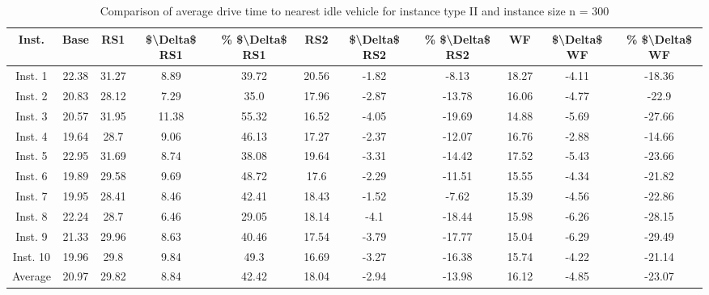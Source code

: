 \begin{table}[H]
\centering
\begin{tabular}{ccccccccccc}
  \hline
  \textbf{Inst.} & \textbf{Base} & \textbf{RS1} & \textbf{\$\textbackslash{}Delta\$  RS1} & \textbf{\% \$\textbackslash{}Delta\$  RS1} & \textbf{RS2} & \textbf{\$\textbackslash{}Delta\$  RS2} & \textbf{\% \$\textbackslash{}Delta\$  RS2} & \textbf{WF} & \textbf{\$\textbackslash{}Delta\$  WF} & \textbf{\% \$\textbackslash{}Delta\$  WF} \\\hline
  Inst. 1 & 22.38 & 31.27 & 8.89 & 39.72 & 20.56 & -1.82 & -8.13 & 18.27 & -4.11 & -18.36 \\
  Inst. 2 & 20.83 & 28.12 & 7.29 & 35.0 & 17.96 & -2.87 & -13.78 & 16.06 & -4.77 & -22.9 \\
  Inst. 3 & 20.57 & 31.95 & 11.38 & 55.32 & 16.52 & -4.05 & -19.69 & 14.88 & -5.69 & -27.66 \\
  Inst. 4 & 19.64 & 28.7 & 9.06 & 46.13 & 17.27 & -2.37 & -12.07 & 16.76 & -2.88 & -14.66 \\
  Inst. 5 & 22.95 & 31.69 & 8.74 & 38.08 & 19.64 & -3.31 & -14.42 & 17.52 & -5.43 & -23.66 \\
  Inst. 6 & 19.89 & 29.58 & 9.69 & 48.72 & 17.6 & -2.29 & -11.51 & 15.55 & -4.34 & -21.82 \\
  Inst. 7 & 19.95 & 28.41 & 8.46 & 42.41 & 18.43 & -1.52 & -7.62 & 15.39 & -4.56 & -22.86 \\
  Inst. 8 & 22.24 & 28.7 & 6.46 & 29.05 & 18.14 & -4.1 & -18.44 & 15.98 & -6.26 & -28.15 \\
  Inst. 9 & 21.33 & 29.96 & 8.63 & 40.46 & 17.54 & -3.79 & -17.77 & 15.04 & -6.29 & -29.49 \\
  Inst. 10 & 19.96 & 29.8 & 9.84 & 49.3 & 16.69 & -3.27 & -16.38 & 15.74 & -4.22 & -21.14 \\
  Average & 20.97 & 29.82 & 8.84 & 42.42 & 18.04 & -2.94 & -13.98 & 16.12 & -4.85 & -23.07 \\\hline
\end{tabular}
\caption{Comparison of average drive time to nearest idle vehicle for instance type II and instance size n = 300}
\label{tab:wait:resrelocation-nearest-drive-time-comparison_II_300}
\end{table}

